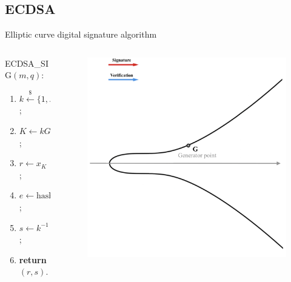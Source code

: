 \documentclass[slidescentered]{beamer}
\begin{document}
	\subsection{ECDSA}
	\begin{frame}{Elliptic curve digital signature algorithm}
		\begin{columns}
			\begin{column}{0.6\linewidth}
				ECDSA\_SIG$(m, q)$:
				\begin{enumerate}
					\item<3 -> $k \xleftarrow{\text{\$}} \{1, ..., n - 1\}$;
					\item<4 -> $K \gets kG$;
					\item<5 -> $r \gets x_K \ (\text{mod} \ n)$;
					\item<6-> $e \gets \text{hash}(m)$;
					\item<7 -> $s \gets k^{-1}(e + rq) \ (\text{mod} \ n)$;
					\item<8 -> \textbf{return} $(r, s)$.
				\end{enumerate}
			\end{column}
			\begin{column}{0.5\linewidth}
				\begin{figure}
				 {\vspace*{-0.5cm}
					\hspace*{-1cm}
					\includegraphics[scale=0.29]{images/ECDSA1}
}
\end{figure}
\end{column}
\end{columns}
\end{frame}
\end{document}
